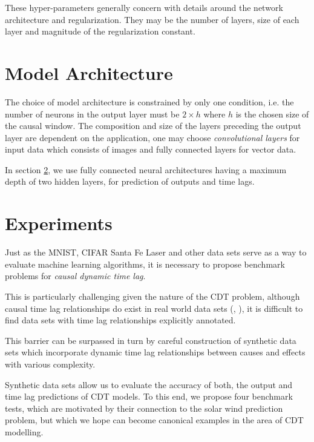 \documentclass[envcountsect,runningheads]{llncs}
\theoremstyle{etoile}
\begin{document}
These hyper-parameters generally concern with details around the network architecture and 
regularization. They may be the number of layers, size of each layer and magnitude of the 
regularization constant.



\section{Model Architecture}

The choice of model architecture is constrained by only one condition, i.e. the number of neurons 
in the output layer must be $2 \times h$ where $h$ is the chosen size of the causal window. 
The composition and size of the layers preceding the output layer are dependent on the application, 
one may choose \emph{convolutional layers} for input data which consists of images and fully connected 
layers for vector data.



In section \ref{sec:exp}, we use fully connected neural architectures having a maximum depth of 
two hidden layers, for prediction of outputs and time lags.

\section{Experiments}\label{sec:exp}


Just as the MNIST, CIFAR Santa Fe Laser and other data sets serve as a way to evaluate machine learning 
algorithms, it is necessary to propose benchmark problems for \emph{causal dynamic time lag}.

This is particularly challenging given the nature of the CDT problem, although causal time lag 
relationships do exist in real world data sets (\cite{doi:10.1002/jgra.50429}, \cite{ZHOU2006195}), 
it is difficult to find data sets with time lag relationships explicitly annotated.

This barrier can be surpassed in turn by careful construction of synthetic data sets which incorporate 
dynamic time lag relationships between causes and effects with various complexity.

Synthetic data sets allow us to evaluate the accuracy of both, the output and time lag predictions of 
CDT models. To this end, we propose four benchmark tests, which are motivated by their connection 
to the solar wind prediction problem, but which we hope can become canonical examples in the area 
of CDT modelling.
\end{document}

